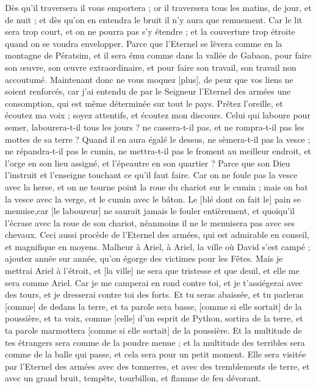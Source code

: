 \begin{multicols}{2}
Dès qu'il traversera il vous emportera ; or il traversera tous les matins, de jour, et de nuit ; et dès qu'on en entendra le bruit il n'y aura que remuement.
Car le lit sera trop court, et on ne pourra pas s'y étendre ; et la couverture trop étroite quand on se voudra envelopper.
Parce que l'Eternel se lèvera comme en la montagne de Pératsim, et il sera ému comme dans la vallée de Gabaon, pour faire son œuvre, son œuvre extraordinaire, et pour faire son travail, son travail non accoutumé.
Maintenant donc ne vous moquez [plus], de peur que vos liens ne soient renforcés, car j'ai entendu de par le Seigneur l'Eternel des armées une consomption, qui est même déterminée sur tout le pays.
Prêtez l'oreille, et écoutez ma voix ; soyez attentifs, et écoutez mon discours.
Celui qui laboure pour semer, labourera-t-il tous les jours ? ne cassera-t-il pas, et ne rompra-t-il pas les mottes de sa terre ?
Quand il en aura égalé le dessus, ne sèmera-t-il pas la vesce ; ne répandra-t-il pas le cumin, ne mettra-t-il pas le froment au meilleur endroit, et l'orge en son lieu assigné, et l'épeautre en son quartier ?
Parce que son Dieu l'instruit et l'enseigne touchant ce qu'il faut faire.
Car on ne foule pas la vesce avec la herse, et on ne tourne point la roue du chariot sur le cumin ; mais on bat la vesce avec la verge, et le cumin avec le bâton.
Le [blé dont on fait le] pain se menuise,car [le laboureur] ne saurait jamais le fouler entièrement, et quoiqu'il l'écrase avec la roue de son chariot, néanmoins il ne le menuisera pas avec ses chevaux.
Ceci aussi procède de l'Eternel des armées, qui est admirable en conseil, et magnifique en moyens.
\VerseOne{}Malheur à Ariel, à Ariel, la ville où David s'est campé ; ajoutez année sur année, qu'on égorge des victimes pour les Fêtes.
Mais je mettrai Ariel à l'étroit, et [la ville] ne sera que tristesse et que deuil, et elle me sera comme Ariel.
Car je me camperai en rond contre toi, et je t'assiégerai avec des tours, et je dresserai contre toi des forts.
Et tu seras abaissée, et tu parleras [comme] de dedans la terre, et ta parole sera basse, [comme si elle sortait] de la poussière, et ta voix, comme [celle] d'un esprit de Python, sortira de la terre, et ta parole marmottera [comme si elle sortait] de la poussière.
Et la multitude de tes étrangers sera comme de la poudre menue ; et la multitude des terribles sera comme de la balle qui passe, et cela sera pour un petit moment.
Elle sera visitée par l'Eternel des armées avec des tonnerres, et avec des tremblements de terre, et avec un grand bruit, tempête, tourbillon, et flamme de feu dévorant.

\end{multicols}
